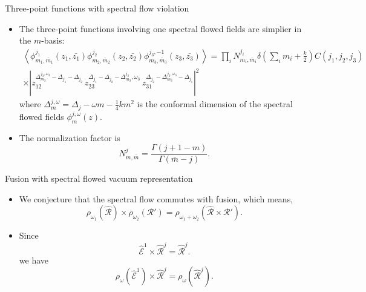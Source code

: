 \documentclass{beamer}
\newcommand{\vev}[1]{\left\langle #1 \right\rangle}
\begin{document}
\begin{frame}{Three-point functions with spectral flow violation}
  \begin{itemize}
    \item The three-point functions involving one spectral flowed fields are simplier in the $m$-basis:
      {\tiny
        \begin{equation}
            \begin{aligned}
                \vev{ \phi^{j_{1}}_{m_{1},\bar{m}_{1}}(z_{1},\bar{z_{1}}) \phi^{j_{2}}_{m_{2},\bar{m}_{2}}(z_{2},\bar{z_{2}}) 
                \phi^{j_{3},-1}_{m_{3},\bar{m}_{3}}(z_{3},\bar{z_{3}})} = \prod_{i} N^{j_{i}}_{m_{i},\bar{m}_{i}} \delta(\sum_{i} m_{i} + \frac{k}{2}) C(j_{1},j_{2},j_{3}) \\
                \times \left| z_{12}^{\Delta_{m_{3}}^{j_{3},\omega_{3}} -\Delta_{j_{1}}-\Delta_{j_{2}}} \, 
                z_{23}^{\Delta_{j_{1}} -\Delta_{j_{2}}-\Delta_{m_{3}}^{j_{3}} ,\omega_{3}} \, 
                z_{31}^{\Delta_{j_{2}} -\Delta_{m_{3}}^{j_{3},\omega_{3}} -\Delta_{j_{1}}}\right|^{2}
            \end{aligned} \label{3pointfunc_m-1}
        \end{equation}
      }
        where $\Delta^{j,\omega}_{m} = \Delta_{j} - \omega m - \frac{1}{4} k m^{2} $ is the conformal dimension of the spectral flowed 
        fields $\phi^{j,\omega}_{m}(z)$.
    \item The normalization factor is 
        \begin{equation}
              N^{j}_{m,\bar{m}} = \frac{\Gamma(j+1-m)}{\Gamma(\bar{m} - j)}.
        \end{equation}
  \end{itemize}
\end{frame}

\begin{frame}{Fusion with spectral flowed vacuum representation}
  \begin{itemize}
    \item We conjecture that the spectral flow commutes with fusion, which means, 
      \begin{equation}
          \rho_{\omega_{1}} \left(\hat{\mathcal{R}}\right) \times \rho_{\omega_{2}} \left(\mathcal{R'}\right) = \rho_{\omega_{1} + \omega_{2}} \left(\hat{\mathcal{R}}\times \mathcal{R'}\right). \label{SpecFus}
      \end{equation}
    \item Since 
      \begin{equation}
        \hat{\mathcal{E}}^{1} \times \hat{\mathcal{R}}^{j} = \hat{\mathcal{R}}^{j}.
      \end{equation}
      we have 
      \begin{equation}
          \rho_{\omega} \left( \hat{\mathcal{E}}^{1} \right) \times \hat{\mathcal{R}}^{j} = \rho_{\omega} \left( \hat{\mathcal{R}}^{j} \right).
      \end{equation}
  \end{itemize}
\end{frame}
\end{document}
